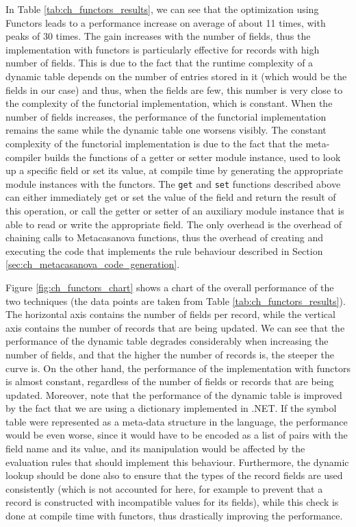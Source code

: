 In Table \ref{tab:ch_functors_results}, we can see that the optimization using Functors leads to a performance increase on average of about 11 times, with peaks of 30 times. The gain increases with the number of fields, thus the implementation with functors is particularly effective for records with high number of fields. This is due to the fact that the runtime complexity of a dynamic table depends on the number of entries stored in it (which would be the fields in our case) and thus, when the fields are few, this number is very close to the complexity of the functorial implementation, which is constant. When the number of fields increases, the performance of the functorial implementation remains the same while the dynamic table one worsens visibly. The constant complexity of the functorial implementation is due to the fact that the meta-compiler builds the functions of a getter or setter module instance, used to look up a specific field or set its value, at compile time by generating the appropriate module instances with the functors. The \texttt{get} and \texttt{set} functions described above can either immediately get or set the value of the field and return the result of this operation, or call the getter or setter of an auxiliary module instance that is able to read or write the appropriate field. The only overhead is the overhead of chaining calls to Metacasanova functions, thus the overhead of creating and executing the code that implements the rule behaviour described in Section \ref{sec:ch_metacasanova_code_generation}.

Figure \ref{fig:ch_functors_chart} shows a chart of the overall performance of the two techniques (the data points are taken from Table \ref{tab:ch_functors_results}). The horizontal axis contains the number of fields per record, while the vertical axis contains the number of records that are being updated. We can see that the performance of the dynamic table degrades considerably when increasing the number of fields, and that the higher the number of records is, the steeper the curve is. On the other hand, the performance of the implementation with functors is almost constant, regardless of the number of fields or records that are being updated. Moreover, note that the performance of the dynamic table is improved by the fact that we are using a dictionary implemented in .NET. If the symbol table were represented as a meta-data structure in the language, the performance would be even worse, since it would have to be encoded as a list of pairs with the field name and its value, and its manipulation would be affected by the evaluation rules that should implement this behaviour. Furthermore, the dynamic lookup should be done also to ensure that the types of the record fields are used consistently (which is not accounted for here, for example to prevent that a record is constructed with incompatible values for its fields), while this check is done at compile time with functors, thus drastically improving the performance.

